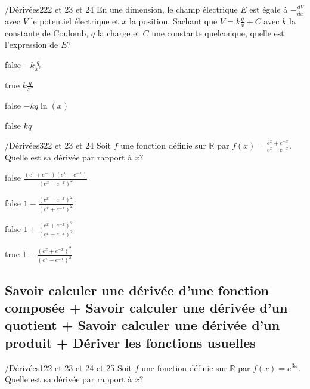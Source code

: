\documentclass[11pt]{article}
\begin{document}
            \begin{question}{/}{Dérivées}{2}{22 et 23 et 24}
                En une dimension, le champ électrique $E$ est égale à $-\frac{dV}{dx}$ avec $V$ le potentiel électrique et $x$ la position. Sachant que $V=k\frac{q}{x}+C$ avec $k$ la constante de Coulomb, $q$ la charge et $C$ une constante quelconque, quelle est l'expression de $E$?
            \end{question}

            \begin{reponses}
                \item[false] $-k\frac{q}{x^2}$
                \item[true] $k\frac{q}{x^2}$
                \item[false] $-kq\ln(x)$
                \item[false] $kq$
            \end{reponses}
        
        	\begin{question}{/}{Dérivées}{3}{22 et 23 et 24}
				Soit $f$ une fonction définie sur $\mathbb{R}$ par  $f(x)=\frac{e^x + e^{-x}}{e^x - e^{-x}}$. Quelle est sa dérivée par rapport à $x$?
            \end{question}

            \begin{reponses}
            	\item[false] $\frac{(e^x + e^{-x})(e^x - e^{-x})}{(e^x - e^{-x})^2}$
            	\item[false] $1-\frac{(e^x - e^{-x})^2}{(e^x + e^{-x})^2}$
                \item[false] $1+\frac{(e^x + e^{-x})^2}{(e^x - e^{-x})^2}$
                \item[true] $1-\frac{(e^x + e^{-x})^2}{(e^x - e^{-x})^2}$
            \end{reponses}

        \subsection{Savoir calculer une dérivée d'une fonction composée + Savoir calculer une dérivée d'un quotient + Savoir calculer une dérivée d'un produit + Dériver les fonctions usuelles}
        
        	\begin{question}{/}{Dérivées}{1}{22 et 23 et 24 et 25}
				Soit $f$ une fonction définie sur $\mathbb{R}$ par $f(x)=e^{3x}$. Quelle est sa dérivée par rapport à $x$?
            \end{question}
\end{document}
